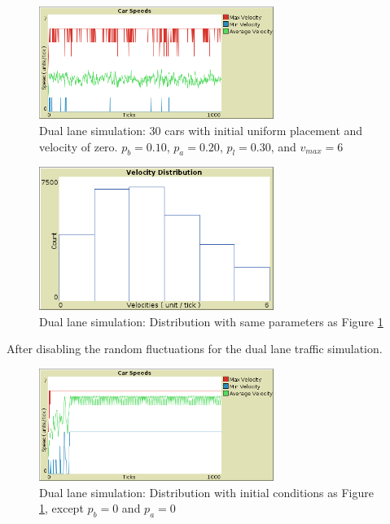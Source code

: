 \documentclass{article}%
\begin{document}
    \begin{figure}[ht!]
        \centering
        \includegraphics[width=3in]{../img/VelocitiesTwoLane.png}
        \caption{Dual lane simulation: 30 cars with initial uniform placement and velocity of zero. $p_b = 0.10$, $p_a = 0.20$, $p_l = 0.30$, and $v_{max} = 6$}
        \label{vtl:31:0d1:0d2}
    \end{figure}
    
    \begin{figure}[ht!]
        \centering
        \includegraphics[width=3in]{../img/VelDistroTwoLane.png}
        \caption{Dual lane simulation: Distribution with same parameters as Figure \ref{vtl:31:0d1:0d2}}
        \label{vtl:d31:0d1:0d2}
    \end{figure}

    After disabling the random fluctuations for the dual lane traffic simulation. 

    \begin{figure}[ht!]
        \centering
        \includegraphics[width=3in]{../img/VelocitiesTwoLane_pb0pa0.png}
        \caption{Dual lane simulation: Distribution with initial conditions as Figure \ref{vtl:31:0d1:0d2}, except $p_b = 0$ and $p_a = 0$}
        \label{vtl:31:0d0:0d0}
    \end{figure}
\end{document}
